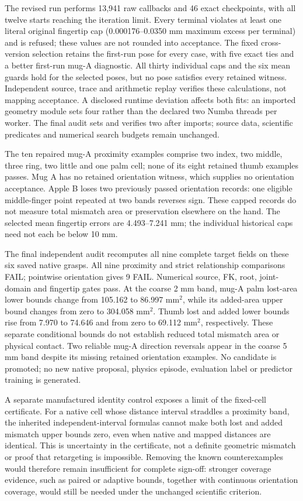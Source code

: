 \documentclass[10pt,letterpaper]{article}
\begin{document}
The revised run performs 13,941 raw callbacks and 46 exact checkpoints, with
all twelve starts reaching the iteration limit. Every terminal violates at
least one literal original fingertip cap (0.000176--0.0350 mm maximum excess
per terminal) and is refused; these values are not rounded into acceptance.
The fixed cross-version selection retains the first-run pose for every case,
with five exact ties and a better first-run mug-A diagnostic. All thirty
individual caps and the six mean guards hold for the selected poses, but no
pose satisfies every retained witness. Independent source, trace and
arithmetic replay verifies these calculations, not mapping acceptance.
A disclosed runtime deviation affects both fits: an imported geometry module
sets four rather than the declared two Numba threads per worker. The final
audit sets and verifies two after imports; source data, scientific predicates
and numerical search budgets remain unchanged.

The ten repaired mug-A proximity examples comprise two index, two middle,
three ring, two little and one palm cell; none of its eight retained thumb
examples passes. Mug A has no retained orientation witness, which supplies no
orientation acceptance. Apple B loses two previously passed orientation
records: one eligible middle-finger point repeated at two bands reverses sign.
These capped records do not measure total mismatch area or preservation
elsewhere on the hand. The selected mean fingertip errors are 4.493--7.241 mm;
the individual historical caps need not each be below 10 mm.

The final independent audit recomputes all nine complete target fields on
these six saved native grasps. All nine proximity and strict relationship
comparisons FAIL; pointwise orientation gives 9 FAIL. Numerical source,
FK, root, joint-domain and fingertip gates pass. At the coarse 2 mm band,
mug-A palm lost-area lower bounds change from 105.162 to 86.997 mm$^2$, while
its added-area upper bound changes from zero to 304.058 mm$^2$. Thumb lost
and added lower bounds rise from 7.970 to 74.646 and from zero to 69.112
mm$^2$, respectively. These separate conditional bounds do not establish
reduced total mismatch area or physical contact. Two reliable mug-A direction
reversals appear in the coarse 5 mm band despite its missing retained
orientation examples. No candidate is promoted; no new native proposal,
physics episode, evaluation label or predictor training is generated.

A separate manufactured identity control exposes a limit of the fixed-cell
certificate. For a native cell whose distance interval straddles a proximity
band, the inherited independent-interval formulas cannot make both lost and
added mismatch upper bounds zero, even when native and mapped distances are
identical. This is uncertainty in the certificate, not a definite geometric
mismatch or proof that retargeting is impossible. Removing the known
counterexamples would therefore remain insufficient for complete sign-off:
stronger coverage evidence, such as paired or adaptive bounds, together with
continuous orientation coverage, would still be needed under the unchanged scientific criterion.
\end{document}
